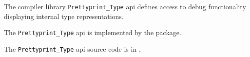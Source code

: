 
The compiler library {\tt Prettyprint\_Type} api defines access to debug functionality displaying internal type representations.

The {\tt Prettyprint\_Type} api is implemented by the  package.

The {\tt Prettyprint\_Type} api source code is in .
